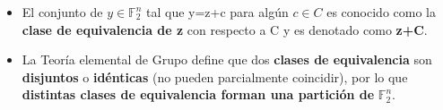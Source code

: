 \documentclass{beamer}
\theoremstyle{plain}
\theoremstyle{example}
\theoremstyle{example}
\begin{document}

\begin{frame}  \small  

\begin{itemize}
\item El conjunto de $y \in \mathbb{F}_2^n$ tal que y=z+c para algún $c \in C$ es conocido como la \textbf{clase de equivalencia de z} con respecto a C y es denotado como \textbf{z+C}. 


\item La Teoría elemental de Grupo define que dos \textbf{clases de equivalencia} son \textbf{disjuntos} o \textbf{idénticas} (no pueden parcialmente coincidir), por lo que \textbf{distintas clases de equivalencia forman una partición de} $\mathbb{F}_2^n$.


\end{itemize}


\end{frame} 
\end{document}
